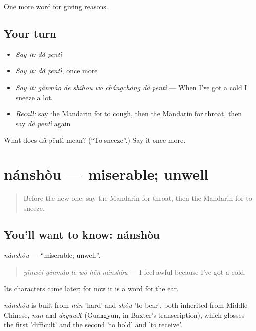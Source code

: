 \begin{grammarlens}[title={What you've built}]
One more word for giving reasons.
\end{grammarlens}

\subsection*{Your turn}
\begin{itemize}
\raggedright
  \item \emph{Say it:} \emph{dǎ pēntì}
  \item \emph{Say it:} \emph{dǎ pēntì}, once more
  \item \emph{Say it:} \emph{gǎnmào de shíhou wǒ chángcháng dǎ pēntì} — When I've got a cold I sneeze a lot.
  \item \emph{Recall:} say the Mandarin for to cough, then the Mandarin for throat, then say \emph{dǎ pēntì} again
\end{itemize}

\begin{tcolorbox}[breakable,colback=teal!4,colframe=teal!35!black,title={Before you move on}]
What does dǎ pēntì mean? (\textquotedblleft{}To sneeze\textquotedblright{}.) Say it once more.
\end{tcolorbox}
\section[nánshòu]{nánshòu — miserable; unwell}

\label{lesson:ZH-C222-nanshou}



\begin{quote}
Before the new one: say the Mandarin for throat, then the Mandarin for to sneeze.
\end{quote}

\subsection*{You'll want to know: nánshòu}
\emph{nánshòu} — \textquotedblleft{}miserable; unwell\textquotedblright{}.

\begin{quote}
\emph{yīnwèi gǎnmào le wǒ hěn nánshòu} — I feel awful because I've got a cold.
\end{quote}

Its characters come later; for now it is a word for the ear.

\begin{cousinweb}
\emph{nánshòu} is built from \emph{nán} 'hard' and \emph{shòu} 'to bear', both inherited from Middle Chinese, \emph{nan} and \emph{dzyuwX} (Guangyun, in Baxter's transcription), which glosses the first 'difficult' and the second 'to hold' and 'to receive'.
\end{cousinweb}

